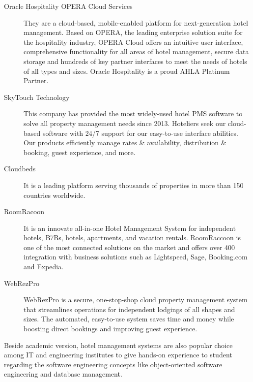 \begin{description}
	\item[Oracle Hospitality OPERA Cloud Services] They are a cloud-based, mobile-enabled platform for next-generation hotel management. Based on OPERA, the leading enterprise solution suite for the hospitality industry, OPERA Cloud offers an intuitive user interface, comprehensive functionality for all areas of hotel management, secure data storage and hundreds of key partner interfaces to meet the needs of hotels of all types and sizes. Oracle Hospitality is a proud AHLA Platinum Partner.
	\item[SkyTouch Technology] This company has provided the most widely-used hotel PMS software to solve all property management needs since 2013. Hoteliers seek our cloud-based software with 24/7 support for our easy-to-use interface abilities. Our products efficiently manage rates \& availability, distribution \& booking, guest experience, and more.
	\item[Cloudbeds] It is a leading platform serving thousands of properties in more than 150 countries worldwide.
	\item[RoomRacoon] It is an innovate all-in-one Hotel Management System for independent hotels, B7Bs, hotels, apartments, and vacation rentals. RoomRaccoon is one of the most connected solutions on the market and offers over 400 integration with business solutions such as Lightspeed, Sage, Booking.com and Expedia. 
	\item[WebRezPro] WebRezPro is a secure, one-stop-shop cloud property management system that streamlines operations for independent lodgings of all shapes and sizes. The automated, easy-to-use system saves time and money while boosting direct bookings and improving guest experience. 
\end{description}

Beside academic version, hotel management systems are also popular choice among IT and engineering institutes to give hands-on experience to student regarding the software engineering concepts like object-oriented software engineering and database management. \cite{IJOE_Hotel_Management}\cite{sri_lanka_HMS_2022}

\clearpage

